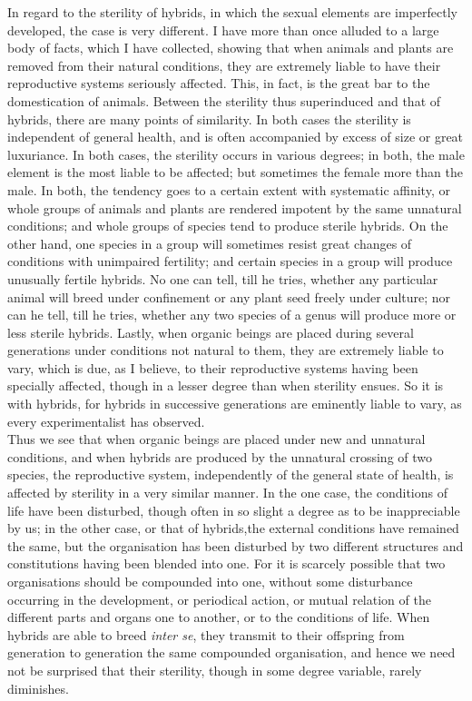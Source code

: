 \indent In regard to the sterility of hybrids, in which the sexual elements are imperfectly developed, the case is very different. I have more than once alluded to a large body of facts, which I have collected, showing that when animals and plants are removed from their natural conditions, they are extremely liable to have their reproductive systems seriously affected. This, in fact, is the great bar to the domestication of animals. Between the sterility thus superinduced and that of hybrids, there are many points of similarity. In both cases the sterility is independent of general health, and is often accompanied by excess of size or great luxuriance. In both cases, the sterility occurs in various degrees; in both, the male element is the most liable to be affected; but sometimes the female more than the male. In both, the tendency goes to a certain extent with systematic affinity, or whole groups of animals and plants are rendered impotent by the same unnatural conditions; and whole groups of species tend to produce sterile hybrids. On the other hand, one species in a group will sometimes resist great changes of conditions with unimpaired fertility; and certain species in a group will produce unusually fertile hybrids. No one can tell, till he tries, whether any particular animal will breed under confinement or any plant seed freely under culture; nor can he tell, till he tries, whether any two species of a genus will produce more or less sterile hybrids. Lastly, when organic beings are placed during several generations under conditions not natural to them, they are extremely liable to vary, which is due, as I believe, to their reproductive systems having been specially affected, though in a lesser degree than when sterility ensues. So it is with hybrids, for hybrids in successive generations are eminently liable to vary, as every experimentalist has observed.\\
\indent Thus we see that when organic beings are placed under new and unnatural conditions, and when hybrids are produced by the unnatural crossing of two species, the reproductive system, independently of the general state of health, is affected by sterility in a very similar manner. In the one case, the conditions of life have been disturbed, though often in so slight a degree as to be inappreciable by us; in the other case, or that of hybrids,the external conditions have remained the same, but the organisation has been disturbed by two different structures and constitutions having been blended into one. For it is scarcely possible that two organisations should be compounded into one, without some disturbance occurring in the development, or periodical action, or mutual relation of the different parts and organs one to another, or to the conditions of life. When hybrids are able to breed \emph{inter se}, they transmit to their offspring from generation to generation the same compounded organisation, and hence we need not be surprised that their sterility, though in some degree variable, rarely diminishes.\\
